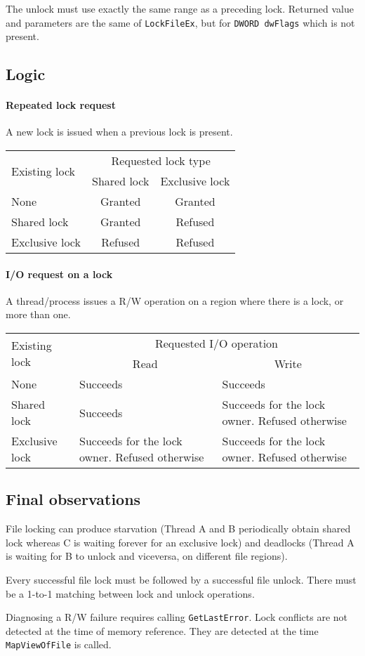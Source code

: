 The unlock must use exactly the same range as a preceding lock. Returned value and parameters are the same of \texttt{LockFileEx}, but for \texttt{DWORD dwFlags} which is not present.

\subsection{Logic}
\paragraph{Repeated lock request}
A new lock is issued when a previous lock is present.
\begin{center}
\begin{tabular}{|l|c|c|}
\hline
\multirow{2}{*}{Existing lock} &  \multicolumn{2}{c|}{Requested lock type} \\\cline{2-3}
 & Shared lock & Exclusive lock \\
\hline
None & Granted & Granted \\
\hline
Shared lock & Granted & Refused \\
\hline
Exclusive lock & Refused & Refused \\
\hline
\end{tabular}
\end{center}

\paragraph{I/O request on a lock}
A thread/process issues a R/W operation on a region where there is a lock, or more than one.
\begin{center}
\begin{tabularx}{\textwidth}{|l|X|X|}
\hline
\multirow{2}{*}{Existing lock} &  \multicolumn{2}{c|}{Requested I/O operation} \\\cline{2-3}
 & \multicolumn{1}{c|}{Read} & \multicolumn{1}{c|}{Write} \\
\hline
None & Succeeds & Succeeds \\
\hline
Shared lock & Succeeds & Succeeds for the lock owner. Refused otherwise \\
\hline
Exclusive lock & Succeeds for the lock owner. Refused otherwise & Succeeds for the lock owner. Refused otherwise \\
\hline
\end{tabularx}
\end{center}

\subsection{Final observations}
File locking can produce starvation (Thread A and B periodically obtain shared lock whereas C is waiting forever for an exclusive lock) and deadlocks (Thread A is waiting for B to unlock and viceversa, on different file regions).

Every successful file lock must be followed by a successful file unlock. There must be a 1-to-1 matching between lock and unlock operations.

Diagnosing a R/W failure requires calling \texttt{GetLastError}. Lock conflicts are not detected at the time of memory reference. They are detected at the time \texttt{MapViewOfFile} is called.